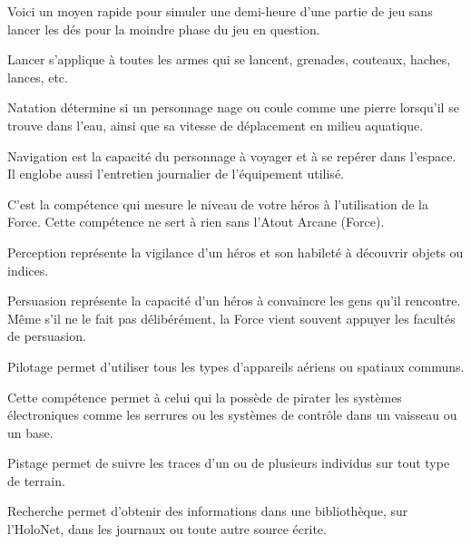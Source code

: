 \begin{description}[align=left]
    \item [Jeu (Int)]
        Voici un moyen rapide pour simuler une demi-heure d’une partie de jeu sans lancer les dés pour la moindre phase du jeu en question.

    \item [Lancer (Agi)]
        Lancer s’applique à toutes les armes qui se lancent, grenades, couteaux, haches, lances, etc.

    \item [Natation (Agi)]
        Natation détermine si un personnage nage ou coule comme une pierre lorsqu’il se trouve dans l’eau, ainsi que sa vitesse de déplacement en milieu aquatique.

    \item [Navigation (Int)]
        Navigation est la capacité du personnage à voyager et à se repérer dans l’espace. Il englobe aussi l’entretien journalier de l’équipement utilisé.

    \item [Maîtrise de la Force (\^Ame)]
        C’est la compétence qui mesure le niveau de votre héros à l’utilisation de la Force. Cette compétence ne sert à rien sans l’Atout Arcane (Force).

    \item [Perception (Int)]
        Perception représente la vigilance d’un héros et son habileté à découvrir objets ou indices.

    \item [Persuasion (\^Ame)]
        Persuasion représente la capacité d’un héros à convaincre les gens qu’il rencontre. Même s’il ne le fait pas délibérément, la Force vient souvent appuyer les facultés de persuasion.

    \item [Pilotage (Agi)]
        Pilotage permet d’utiliser tous les types d’appareils aériens ou spatiaux communs.

    \item [Piratage (Int)]
        Cette compétence permet à celui qui la possède de pirater les systèmes électroniques comme les serrures ou les systèmes de contrôle dans un vaisseau ou un base.

    \item [Pistage (Int)]
        Pistage permet de suivre les traces d’un ou de plusieurs individus sur tout type de terrain.

    \item [Recherche (Int)]
        Recherche permet d’obtenir des informations dans une bibliothèque, sur l’HoloNet, dans les journaux ou toute autre source écrite.


\end{description}
